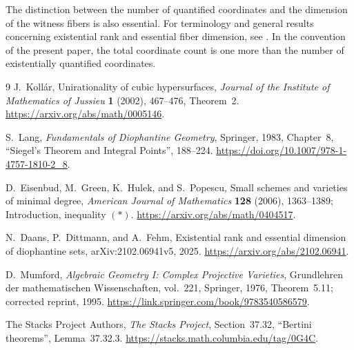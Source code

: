 \documentclass[11pt,a4paper]{article}
\theoremstyle{definition}
\begin{document}
The distinction between the number of quantified coordinates
and the dimension of the witness fibers is also essential.
For terminology and general results concerning existential rank
and essential fiber dimension, see \cite{DDF}. In the convention
of the present paper, the total coordinate count is one more
than the number of existentially quantified coordinates.

\begin{thebibliography}{9}
J.~Koll\'ar, Unirationality of cubic hypersurfaces,
\emph{Journal of the Institute of Mathematics of Jussieu}
\textbf{1} (2002), 467--476, Theorem~2.
\url{https://arxiv.org/abs/math/0005146}.

S.~Lang, \emph{Fundamentals of Diophantine Geometry},
Springer, 1983, Chapter~8, ``Siegel's Theorem and Integral Points'',
188--224.
\url{https://doi.org/10.1007/978-1-4757-1810-2_8}.

D.~Eisenbud, M.~Green, K.~Hulek, and S.~Popescu,
Small schemes and varieties of minimal degree,
\emph{American Journal of Mathematics} \textbf{128} (2006),
1363--1389; Introduction, inequality $(*)$.
\url{https://arxiv.org/abs/math/0404517}.

N.~Daans, P.~Dittmann, and A.~Fehm,
Existential rank and essential dimension of diophantine sets,
arXiv:2102.06941v5, 2025.
\url{https://arxiv.org/abs/2102.06941}.

D.~Mumford, \emph{Algebraic Geometry I: Complex Projective Varieties},
Grundlehren der mathematischen Wissenschaften, vol.~221,
Springer, 1976, Theorem~5.11; corrected reprint, 1995.
\url{https://link.springer.com/book/9783540586579}.

The Stacks Project Authors, \emph{The Stacks Project},
Section~37.32, ``Bertini theorems'', Lemma~37.32.3.
\url{https://stacks.math.columbia.edu/tag/0G4C}.
\end{thebibliography}
\end{document}
